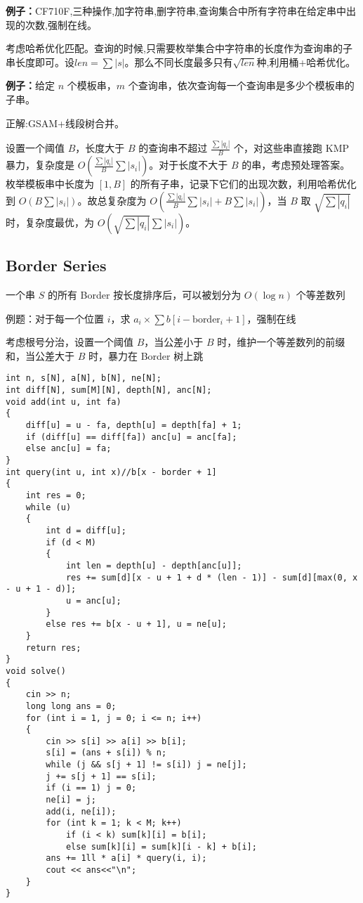 \documentclass[a4paper, fontset=none]{ctexart}
\begin{document}
\textbf{例子：}CF710F,三种操作,加字符串,删字符串,查询集合中所有字符串在给定串中出现的次数,强制在线。

考虑哈希优化匹配。查询的时候,只需要枚举集合中字符串的长度作为查询串的子串长度即可。设$len=\sum|s|$。那么不同长度最多只有$\sqrt{len}$种,利用桶+哈希优化。

\textbf{例子：}给定 $n$ 个模板串，$m$ 个查询串，依次查询每一个查询串是多少个模板串的子串。

正解:GSAM+线段树合并。

设置一个阈值 $B$，长度大于 $B$ 的查询串不超过 $\frac{\sum|q_i|}{B}$ 个，对这些串直接跑 $\text{KMP}$ 暴力，复杂度是 $O(\frac{\sum|q_i|}{B}\sum|s_i|)$。对于长度不大于 $B$ 的串，考虑预处理答案。枚举模板串中长度为 $[1, B]$ 的所有子串，记录下它们的出现次数，利用哈希优化到 $O(B\sum|s_i|)$。故总复杂度为 $O(\frac{\sum|q_i|}{B}\sum|s_i|+B\sum|s_i|)$，当 $B$ 取 $\sqrt{\sum|q_i|}$ 时，复杂度最优，为 $O(\sqrt{\sum|q_i|}\sum|s_i|)$。
\subsection{Border Series}

一个串 $S$ 的所有 Border 按长度排序后，可以被划分为 $O(\log n)$ 个等差数列

例题：对于每一个位置 $i$，求 $a_i \times \sum b[i-\text{border}_i+1]$，强制在线

考虑根号分治，设置一个阈值 $B$，当公差小于 $B$ 时，维护一个等差数列的前缀和，当公差大于 $B$ 时，暴力在 Border 树上跳

\begin{verbatim}
int n, s[N], a[N], b[N], ne[N];
int diff[N], sum[M][N], depth[N], anc[N];
void add(int u, int fa)
{
    diff[u] = u - fa, depth[u] = depth[fa] + 1;
    if (diff[u] == diff[fa]) anc[u] = anc[fa];
    else anc[u] = fa;
}
int query(int u, int x)//b[x - border + 1]
{
    int res = 0;
    while (u)
    {
        int d = diff[u];
        if (d < M)
        {
            int len = depth[u] - depth[anc[u]];
            res += sum[d][x - u + 1 + d * (len - 1)] - sum[d][max(0, x - u + 1 - d)];
            u = anc[u];
        }
        else res += b[x - u + 1], u = ne[u];
    }
    return res;
}
void solve()
{
    cin >> n;
    long long ans = 0;
    for (int i = 1, j = 0; i <= n; i++)
    {
        cin >> s[i] >> a[i] >> b[i];
        s[i] = (ans + s[i]) % n;
        while (j && s[j + 1] != s[i]) j = ne[j];
        j += s[j + 1] == s[i];
        if (i == 1) j = 0;
        ne[i] = j;
        add(i, ne[i]);
        for (int k = 1; k < M; k++)
            if (i < k) sum[k][i] = b[i];
            else sum[k][i] = sum[k][i - k] + b[i];
        ans += 1ll * a[i] * query(i, i);
        cout << ans<<"\n";
    }
}
\end{verbatim}
\end{document}
